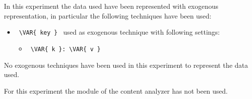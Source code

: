 In this experiment the data used have been represented with exogenous representation, in particular the
following techniques have been used:
\begin{itemize}
    \item
     \verb| \VAR{ key } | used as exogenous technique with following settings:
     \begin{itemize}
             \item
             \verb| \VAR{ k }: \VAR{ v }|
     \end{itemize}
\end{itemize}
No exogenous techniques have been used in this experiment to represent the data used.




For this experiment the module of the content analyzer has not been used.
\hfill\break
\hfill\break

